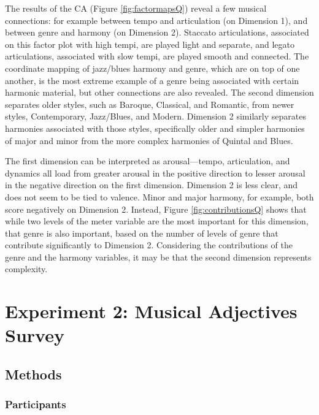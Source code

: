 \documentclass[
  english,
  man,floatsintext]{apa6}
\begin{document}
The results of the CA (Figure \ref{fig:factormapsQ}) reveal a few musical connections: for example between tempo and articulation (on Dimension 1), and between genre and harmony (on Dimension 2). Staccato articulations, associated on this factor plot with high tempi, are played light and separate, and legato articulations, associated with slow tempi, are played smooth and connected. The coordinate mapping of jazz/blues harmony and genre, which are on top of one another, is the most extreme example of a genre being associated with certain harmonic material, but other connections are also revealed. The second dimension separates older styles, such as Baroque, Classical, and Romantic, from newer styles, Contemporary, Jazz/Blues, and Modern. Dimension 2 similarly separates harmonies associated with those styles, specifically older and simpler harmonies of major and minor from the more complex harmonies of Quintal and Blues.

The first dimension can be interpreted as arousal---tempo, articulation, and dynamics all load from greater arousal in the positive direction to lesser arousal in the negative direction on the first dimension. Dimension 2 is less clear, and does not seem to be tied to valence. Minor and major harmony, for example, both score negatively on Dimension 2. Instead, Figure \ref{fig:contributionsQ} shows that while two levels of the meter variable are the most important for this dimension, that genre is also important, based on the number of levels of genre that contribute significantly to Dimension 2. Considering the contributions of the genre and the harmony variables, it may be that the second dimension represents complexity.

\hypertarget{experiment-2-musical-adjectives-survey}{%
\section{Experiment 2: Musical Adjectives Survey}\label{experiment-2-musical-adjectives-survey}}

\hypertarget{methods-1}{%
\subsection{Methods}\label{methods-1}}

\hypertarget{participants-2}{%
\subsubsection{Participants}\label{participants-2}}
\end{document}
